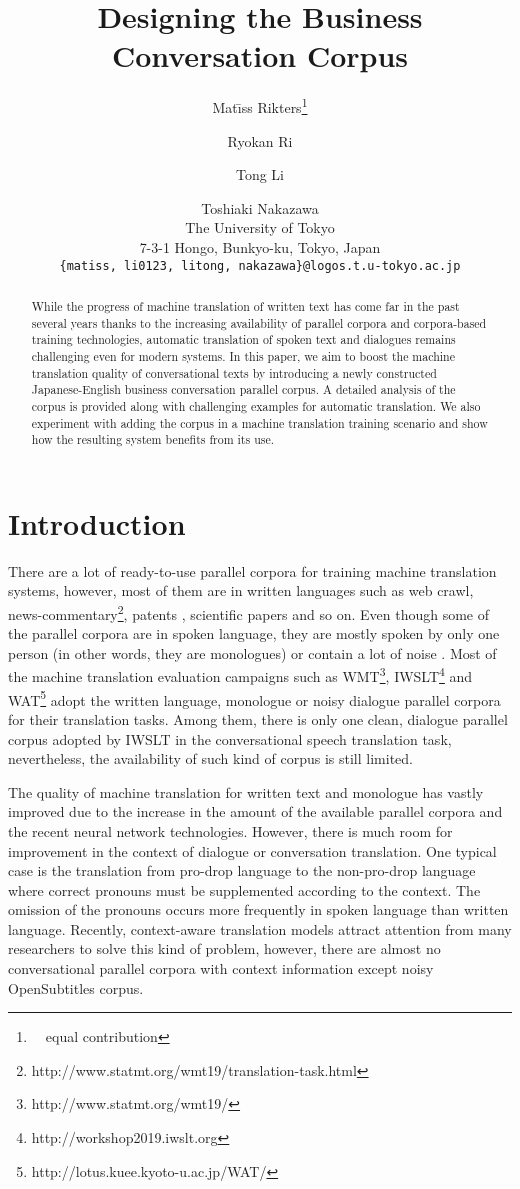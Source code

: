 \documentclass[11pt,a4paper]{article}
\title{Designing the Business Conversation Corpus}
\author{
    Mat\={\i}ss Rikters\thanks{\ \ equal contribution} \and Ryokan Ri\footnotemark[1] \and Tong Li\footnotemark[1] \and Toshiaki Nakazawa \\
    The University of Tokyo \\
    7-3-1 Hongo, Bunkyo-ku, Tokyo, Japan \\
    {\tt \{matiss, li0123, litong, nakazawa\}@logos.t.u-tokyo.ac.jp} \\
  }
\date{}
\begin{document}
\maketitle
\begin{abstract}
    While the progress of machine translation of written text has come far in the past several years thanks to the increasing availability of parallel corpora and corpora-based training technologies, automatic translation of spoken text and dialogues remains challenging even for modern systems. In this paper, we aim to boost the machine translation quality of conversational texts by introducing a newly constructed Japanese-English business conversation parallel corpus. A detailed analysis of the corpus is provided along with challenging examples for automatic translation. We also experiment with adding the corpus in a machine translation training scenario and show how the resulting system benefits from its use.
\end{abstract}


\section{Introduction}
\label{sec:intro}

There are a lot of ready-to-use parallel corpora for training machine translation systems, however, most of them are in written languages such as web crawl, news-commentary\footnote{http://www.statmt.org/wmt19/translation-task.html}, patents \cite{ntcir9-patmt}, scientific papers \cite{NAKAZAWA16.621} and so on. Even though some of the parallel corpora are in spoken language, they are mostly spoken by only one person (in other words, they are monologues) \cite{cettoloEtAl:EAMT2012,mustc19} or contain a lot of noise \cite{tiedemann-2016-finding,pryzant_jesc_2018}. Most of the machine translation evaluation campaigns such as WMT\footnote{http://www.statmt.org/wmt19/}, IWSLT\footnote{http://workshop2019.iwslt.org} and WAT\footnote{http://lotus.kuee.kyoto-u.ac.jp/WAT/} adopt the written language, monologue or noisy dialogue parallel corpora for their translation tasks. Among them, there is only one clean, dialogue parallel corpus \cite{salesky2018slt} adopted by IWSLT in the conversational speech translation task, nevertheless, the availability of such kind of corpus is still limited.

The quality of machine translation for written text and monologue has vastly improved due to the increase in the amount of the available parallel corpora and the recent neural network technologies. However, there is much room for improvement in the context of dialogue or conversation translation. One typical case is the translation from pro-drop language to the non-pro-drop language where correct pronouns must be supplemented according to the context. The omission of the pronouns occurs more frequently in spoken language than written language. Recently, context-aware translation models attract attention from many researchers \cite{tiedemann-scherrer-2017-neural,voita-etal-2018-context,voita-etal-2019-good} to solve this kind of problem, however, there are almost no conversational parallel corpora with context information except noisy OpenSubtitles corpus.
\end{document}
